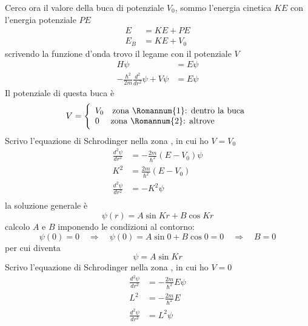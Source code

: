 Cerco ora il valore della buca di potenziale $V_0$, sommo l'energia cinetica $KE$ con l'energia potenziale $PE$
\begin{equation}
\begin{split}
E & = KE + PE \\
E_B & = KE + V_0
\end{split}
\end{equation}
scrivendo la funzione d'onda trovo il legame con il potenziale $V$
\begin{equation}
\begin{split}
H \psi & = E \psi \\
- \frac{\hbar^2}{2m} \frac{d^2}{dr^2} \psi + V \psi & = E \psi
\end{split}
\end{equation}
Il potenziale di questa buca è
\begin{equation}
V = 
\Bigg\{\begin{array}{l}
V_0 \quad\mbox{zona \Romannum{1}: dentro la buca} \\
0 \quad\mbox{ zona \Romannum{2}: altrove}
\end{array}
\end{equation}
Scrivo l'equazione di Schrodinger nella zona , in cui ho $V = V_0$
\begin{equation}
\begin{split}
\frac{d^2 \psi}{d r^2} & = -\frac{2m}{\hbar^2} (E - V_0) \psi \\
K^2 &= \frac{2m}{\hbar^2} (E - V_0) \\
\frac{d^2 \psi}{d r^2} & = - K^2 \psi \\
\end{split}
\end{equation}
la soluzione generale è
\begin{equation}
\psi(r) = A \sin Kr + B \cos Kr
\end{equation}
calcolo $A$ e $B$ imponendo le condizioni al contorno:
\begin{equation}
\psi (0) = 0 \quad\Rightarrow\quad \psi(0) = A \sin 0 + B \cos 0 = 0 \quad\Rightarrow\quad B=0
\end{equation}
per cui diventa
\begin{equation}
\psi = A \sin K r
\label{psi_1}
\end{equation}
Scrivo l'equazione di Schrodinger nella zona , in cui ho $V =0$
\begin{equation}
\begin{split}
\frac{d^2 \psi}{d r^2} & = -\frac{2m}{\hbar^2} E \psi \\
L^2 &= - \frac{2m}{\hbar^2} E \\
\frac{d^2 \psi}{d r^2} & = L^2 \psi \\
\end{split}
\end{equation}
